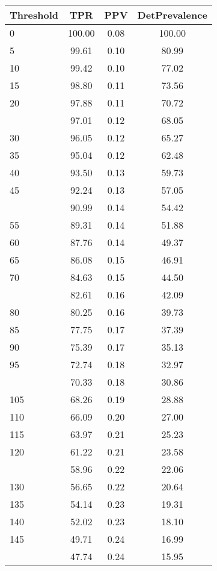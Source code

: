 \begin{table}[ht]
\centering
\begin{tabular}{lccc}
  \toprule
Threshold & TPR & PPV & DetPrevalence \\ 
  \midrule
0 & 100.00 & 0.08 & 100.00 \\ 
  5 & 99.61 & 0.10 & 80.99 \\ 
  10 & 99.42 & 0.10 & 77.02 \\ 
  15 & 98.80 & 0.11 & 73.56 \\ 
  20 & 97.88 & 0.11 & 70.72 \\ 
   \addlinespace
25 & 97.01 & 0.12 & 68.05 \\ 
  30 & 96.05 & 0.12 & 65.27 \\ 
  35 & 95.04 & 0.12 & 62.48 \\ 
  40 & 93.50 & 0.13 & 59.73 \\ 
  45 & 92.24 & 0.13 & 57.05 \\ 
   \addlinespace
50 & 90.99 & 0.14 & 54.42 \\ 
  55 & 89.31 & 0.14 & 51.88 \\ 
  60 & 87.76 & 0.14 & 49.37 \\ 
  65 & 86.08 & 0.15 & 46.91 \\ 
  70 & 84.63 & 0.15 & 44.50 \\ 
   \addlinespace
75 & 82.61 & 0.16 & 42.09 \\ 
  80 & 80.25 & 0.16 & 39.73 \\ 
  85 & 77.75 & 0.17 & 37.39 \\ 
  90 & 75.39 & 0.17 & 35.13 \\ 
  95 & 72.74 & 0.18 & 32.97 \\ 
   \addlinespace
100 & 70.33 & 0.18 & 30.86 \\ 
  105 & 68.26 & 0.19 & 28.88 \\ 
  110 & 66.09 & 0.20 & 27.00 \\ 
  115 & 63.97 & 0.21 & 25.23 \\ 
  120 & 61.22 & 0.21 & 23.58 \\ 
   \addlinespace
125 & 58.96 & 0.22 & 22.06 \\ 
  130 & 56.65 & 0.22 & 20.64 \\ 
  135 & 54.14 & 0.23 & 19.31 \\ 
  140 & 52.02 & 0.23 & 18.10 \\ 
  145 & 49.71 & 0.24 & 16.99 \\ 
   \addlinespace
150 & 47.74 & 0.24 & 15.95 \\ 

\end{tabular}
\end{table}
